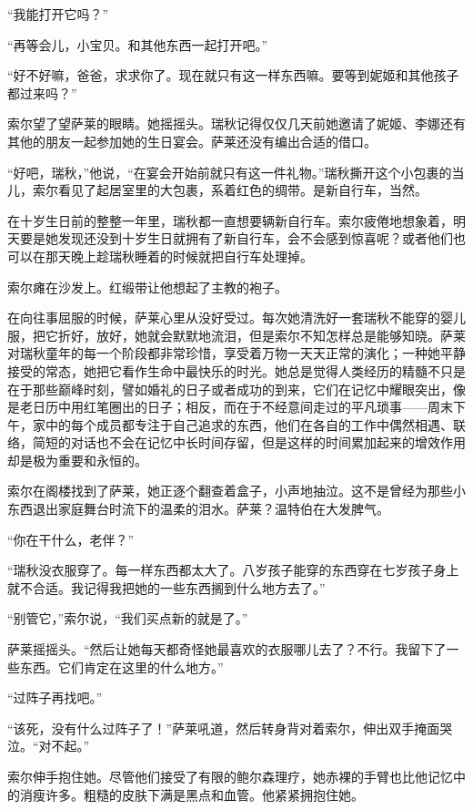 \documentclass[AutoFakeBold=true]{book}
\begin{document}
``我能打开它吗？''

``再等会儿，小宝贝。和其他东西一起打开吧。''

``好不好嘛，爸爸，求求你了。现在就只有这一样东西嘛。要等到妮姬和其他孩子都过来吗？''

索尔望了望萨莱的眼睛。她摇摇头。瑞秋记得仅仅几天前她邀请了妮姬、李娜还有其他的朋友一起参加她的生日宴会。萨莱还没有编出合适的借口。

``好吧，瑞秋，''他说，``在宴会开始前就只有这一件礼物。''瑞秋撕开这个小包裹的当儿，索尔看见了起居室里的大包裹，系着红色的绸带。是新自行车，当然。

在十岁生日前的整整一年里，瑞秋都一直想要辆新自行车。索尔疲倦地想象着，明天要是她发现还没到十岁生日就拥有了新自行车，会不会感到惊喜呢？或者他们也可以在那天晚上趁瑞秋睡着的时候就把自行车处理掉。

索尔瘫在沙发上。红缎带让他想起了主教的袍子。

\vspace*{1em}

在向往事屈服的时候，萨莱心里从没好受过。每次她清洗好一套瑞秋不能穿的婴儿服，把它折好，放好，她就会默默地流泪，但是索尔不知怎样总是能够知晓。萨莱对瑞秋童年的每一个阶段都非常珍惜，享受着万物一天天正常的演化；一种她平静接受的常态，她把它看作生命中最快乐的时光。她总是觉得人类经历的精髓不只是在于那些巅峰时刻，譬如婚礼的日子或者成功的到来，它们在记忆中耀眼突出，像是老日历中用红笔圈出的日子；相反，而在于不经意间走过的平凡琐事——周末下午，家中的每个成员都专注于自己追求的东西，他们在各自的工作中偶然相遇、联络，简短的对话也不会在记忆中长时间存留，但是这样的时间累加起来的增效作用却是极为重要和永恒的。

索尔在阁楼找到了萨莱，她正逐个翻查着盒子，小声地抽泣。这不是曾经为那些小东西退出家庭舞台时流下的温柔的泪水。萨莱？温特伯在大发脾气。

``你在干什么，老伴？''

``瑞秋没衣服穿了。每一样东西都太大了。八岁孩子能穿的东西穿在七岁孩子身上就不合适。我记得我把她的一些东西搁到什么地方去了。''

``别管它，''索尔说，``我们买点新的就是了。''

萨莱摇摇头。``然后让她每天都奇怪她最喜欢的衣服哪儿去了？不行。我留下了一些东西。它们肯定在这里的什么地方。''

``过阵子再找吧。''

``该死，没有什么过阵子了！''萨莱吼道，然后转身背对着索尔，伸出双手掩面哭泣。``对不起。''

索尔伸手抱住她。尽管他们接受了有限的鲍尔森理疗，她赤裸的手臂也比他记忆中的消瘦许多。粗糙的皮肤下满是黑点和血管。他紧紧拥抱住她。
\end{document}
